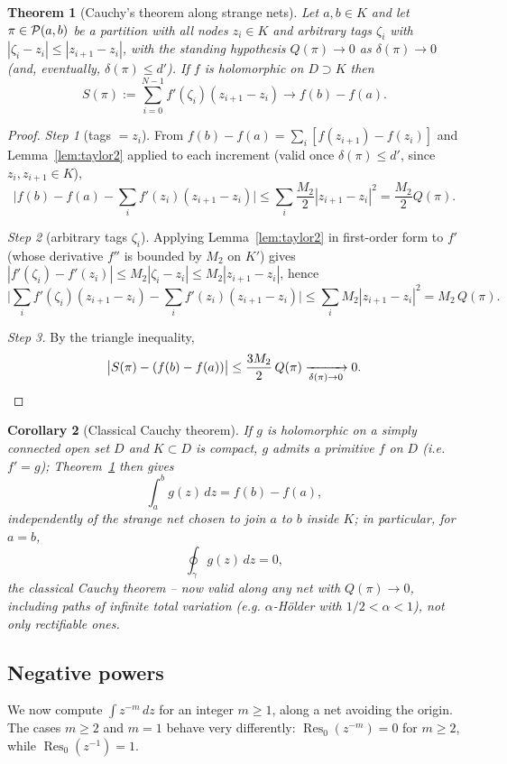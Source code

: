 \documentclass[11pt,fleqn]{article}
\theoremstyle{plain}
\newtheorem{thm}{Theorem}[section]
\newtheorem{cor}[thm]{Corollary}
\theoremstyle{remark}
\begin{document}
\begin{thm}[Cauchy's theorem along strange nets]\label{thm:cauchynet}
Let $a,b\in K$ and let $\pi\in{\cal P}(a,b)$ be a partition with all nodes
$z_i\in K$ and arbitrary tags $\zeta_i$ with $|\zeta_i-z_i|\le|z_{i+1}-z_i|$, with the standing
hypothesis $Q(\pi)\to0$ as $\delta(\pi)\to0$ (and, eventually,
$\delta(\pi)\le d'$). If $f$ is holomorphic on $D\supset K$ then
\[
S(\pi):=\sum_{i=0}^{N-1}f'(\zeta_i)(z_{i+1}-z_i)\longrightarrow f(b)-f(a).
\]
\end{thm}
\begin{proof}
\emph{Step 1} (tags $=z_i$). From $f(b)-f(a)=\sum_i[f(z_{i+1})-f(z_i)]$ and
Lemma~\ref{lem:taylor2} applied to each increment (valid once
$\delta(\pi)\le d'$, since $z_i,z_{i+1}\in K$),
\[
\Big|f(b)-f(a)-\sum_if'(z_i)(z_{i+1}-z_i)\Big|\le\sum_i\frac{M_2}2|z_{i+1}-z_i|^2
=\frac{M_2}2Q(\pi).
\]

\emph{Step 2} (arbitrary tags $\zeta_i$). Applying Lemma~\ref{lem:taylor2}
in first-order form to $f'$ (whose derivative $f''$ is bounded by $M_2$ on
$K'$) gives $|f'(\zeta_i)-f'(z_i)|\le M_2|\zeta_i-z_i|\le M_2|z_{i+1}-z_i|$,
hence
\[
\Big|\sum_if'(\zeta_i)(z_{i+1}-z_i)-\sum_if'(z_i)(z_{i+1}-z_i)\Big|
\le\sum_iM_2|z_{i+1}-z_i|^2=M_2\,Q(\pi).
\]

\emph{Step 3.} By the triangle inequality,
\[
\big|S(\pi)-(f(b)-f(a))\big|\le\frac{3M_2}2\,Q(\pi)
\xrightarrow[\delta(\pi)\to0]{}0. \qedhere
\]
\end{proof}

\begin{cor}[Classical Cauchy theorem]\label{cor:cauchyclassic}
If $g$ is holomorphic on a simply connected open set $D$ and $K\subset D$
is compact, $g$ admits a primitive $f$ on $D$ (i.e.\ $f'=g$);
Theorem~\ref{thm:cauchynet} then gives
\[
\int_a^bg(z)\,dz=f(b)-f(a),
\]
independently of the strange net chosen to join $a$ to $b$ inside $K$; in
particular, for $a=b$,
\[
\oint_\gamma g(z)\,dz=0,
\]
the classical Cauchy theorem -- now valid along any net with
$Q(\pi)\to0$, including paths of infinite total variation (e.g.
$\alpha$-H\"older with $1/2<\alpha<1$), not only rectifiable ones.
\end{cor}

\subsection{Negative powers}

We now compute $\int z^{-m}\,dz$ for an integer $m\ge1$, along a net
avoiding the origin. The cases $m\ge2$ and $m=1$ behave very differently:
$\operatorname{Res}_0(z^{-m})=0$ for $m\ge2$, while
$\operatorname{Res}_0(z^{-1})=1$.
\end{document}

